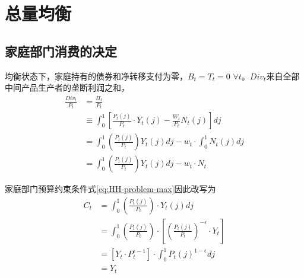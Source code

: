 \section{总量均衡}
\label{sec:Equilibrium-cond}



\subsection{家庭部门消费的决定}
\label{equilibrium-cond-HH-consumption}
均衡状态下，家庭持有的债券和净转移支付为零，$B_t=T_t = 0$ $\forall t$。$Div_t$来自全部中间产品生产者的垄断利润之和，
\begin{equation}
  \label{eq:quili-cond-HH-Div-Pi}
\begin{split}
  \frac{Div_t}{P_t} &= \frac{\Pi_t}{P_t} \\
  &\equiv \int_{0}^1 \left[ \frac{P_t(j)}{P_t} \cdot Y_t(j) - \frac{W_t}{P_t} N_t(j) \right] dj \\
  &= \int_{0}^1 \left( \frac{P_t(j)}{P_t} \right) Y_t(j) dj - w_t \cdot \int_{0}^1 N_t(j) dj \\
  &= \int_{0}^1 \left( \frac{P_t(j)}{P_t} \right) Y_t(j) dj - w_t \cdot N_t
\end{split}
\end{equation}

家庭部门预算约束条件式\eqref{eq:HH-problem-max}因此改写为
\begin{equation}
  \label{eq:HH-problem-C-Y}
  \begin{split}
      C_t &= \int_0^1  \left( \frac{P_t(j)}{P_t}\right) \cdot Y_t(j) dj \\
      &=\int_0^1  \left( \frac{P_t(j)}{P_t}\right) \cdot \left[ \left( \frac{P_t(j)}{P_t}\right)^{-\epsilon} \cdot Y_t \right]\\
      &=\left[Y_t \cdot P_t^{\epsilon -1}\right] \cdot \int_{0}^1 P_t(j)^{1-\epsilon} dj \\
      &=Y_t
  \end{split}
\end{equation}

